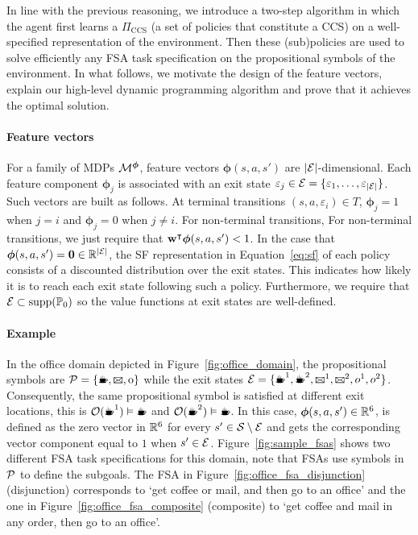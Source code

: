 In line with the previous reasoning, we introduce a two-step algorithm in which the agent first learns a $\Pi_{\text{CCS}}$ (a set of policies that constitute a CCS) on a well-specified representation of the environment. Then these (sub)policies are used to solve efficiently any FSA task specification on the propositional symbols of the environment. In what follows, we motivate the design of the feature vectors, explain our high-level dynamic programming algorithm and prove that it achieves the optimal solution.

 \paragraph{Feature vectors} For a family of MDPs $\mathcal{M}^{\boldsymbol{\phi}}$, feature vectors $\boldsymbol\phi(s, a, s')$ are \mbox{$\lvert\mathcal{E}\rvert$-dimensional}. Each feature component $\boldsymbol\phi_j$ is associated with an exit state $\varepsilon_j\in\mathcal{E}=\{\varepsilon_1,\ldots,\varepsilon_{\lvert\mathcal{E}\rvert}\}$. Such vectors are built as follows. At terminal transitions $(s, a, \varepsilon_i)\in T$, $\boldsymbol\phi_{j} = 1$ when $j=i$ and $\boldsymbol\phi_{j}=0$ when $j\neq i$. For non-terminal transitions,  For non-terminal transitions, we just require that $\mathbf{w}^\intercal\boldsymbol\phi(s, a, s')<1$. In the case that ${\boldsymbol\phi(s, a, s')=\textbf{0}\in\mathbb{R}^{\lvert\mathcal{E}\rvert}}$, the SF representation in Equation~\eqref{eq:sf} of each policy consists of a discounted distribution over the exit states. This indicates how likely it is to reach each exit state following such a policy. Furthermore, we require that $\mathcal{E}\subset\text{supp}(\mathbb{P}_0)$ so the value functions at exit states are well-defined.

 \paragraph{Example} In the office domain depicted in Figure~\ref{fig:office_domain}, the propositional symbols are $\cP=\{\text{\coffee}, \text{\mail}, \text{o}\}$ while the exit states $\cE=\{\text{\coffee}^1, \text{\coffee}^2,\text{\mail}^1,\text{\mail}^2,o^1,o^2\}$. Consequently, the same propositional symbol is satisfied at different exit locations, this is $\cO(\text{\coffee}^1)\vDash\text{\coffee}$ and $\cO(\text{\coffee}^2)\vDash\text{\coffee}$. In this case, $\boldsymbol\phi(s, a, s')\in\mathbb{R}^6$, is defined as the zero vector in $\mathbb{R}^6$ for every $s'\in\mathcal{S}\setminus\mathcal{E}$ and gets the corresponding vector component equal to $1$ when $s'\in\mathcal{E}$. Figure~\ref{fig:sample_fsas} shows two different FSA task specifications for this domain, note that FSAs use symbols in $\mathcal{P}$ to define the subgoals. The FSA in Figure~\ref{fig:office_fsa_disjunction} (disjunction) corresponds to `get coffee or mail, and then go to an office' and the one in Figure~\ref{fig:office_fsa_composite} (composite) to `get coffee and mail in any order, then go to an office'. 


